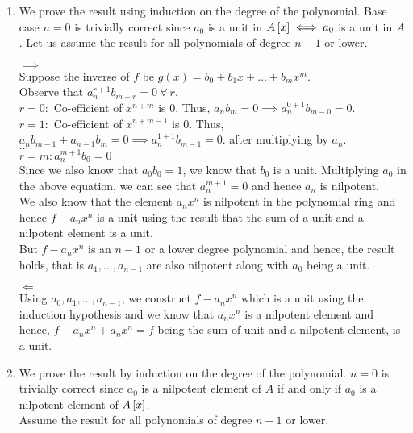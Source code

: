 \begin{enumerate}

	\item
	We prove the result using induction on the degree of the polynomial.
	Base case \( n = 0 \) is trivially correct since \( a_0 \) is a unit
	in \( A\left[ x \right] \iff a_0 \) is a unit in \( A \).
	Let us assume the result for all polynomials of degree \( n-1 \) or lower.

	\( \implies \) \\
	Suppose the inverse of \( f \) be
	\( g(x) = b_0 + b_1 x + \ldots + b_m x^m \). \\
	Observe that \( a_n^{r+1} b_{m-r} = 0 \ \forall\ r \). \\
	\( r = 0 : \) Co-efficient of \( x^{n+m} \) is 0.
	Thus, \( a_n b_m = 0 \implies a_n^{0+1} b_{m-0} = 0 \). \\
	\( r = 1 : \) Co-efficient of \( x^{n+m-1} \) is 0.
	Thus, \( a_n b_{m-1} + a_{n-1} b_m = 0 \implies a_n^{1+1} b_{m-1} = 0 \).
	after multiplying by \( a_n \). \\
	\( \ldots \) \\
	\( r = m : a_n^{m+1} b_0 = 0 \) \\
	Since we also know that \( a_0 b_0 = 1 \), we know that \( b_0 \) is
	a unit.
	Multiplying \( a_0 \) in the above equation, we can see that
	\( a_n^{m+1} = 0 \) and hence \( a_n \) is nilpotent. \\
	We also know that the element \( a_n x^n \) is nilpotent in the
	polynomial ring and hence \( f - a_n x^n \) is a unit using the
	result that the sum of a unit and a nilpotent element is a unit. \\
	But \( f - a_n x^n \) is an \( n-1 \) or a lower degree polynomial and
	hence, the result holds, that is \( a_1, \ldots, a_{n-1} \) are also
	nilpotent along with \( a_0 \) being a unit.

	\( \Longleftarrow \) \\
	Using \( a_0, a_1, \ldots, a_{n-1} \), we construct \( f - a_n x^n \)
	which is a unit using the induction hypothesis and we know that
	\( a_n x^n \) is a nilpotent element and hence,
	\( f - a_n x^n + a_n x^n = f \) being the sum of unit and
	a nilpotent element, is a unit.


	\item
	We prove the result by induction on the degree of the polynomial.
	\( n = 0 \) is trivially correct since
	\( a_0 \) is a nilpotent element of \( A \) if and only if \( a_0 \) is
	a nilpotent element of \( A\left[ x \right] \). \\
	Assume the result for all polynomials of degree \( n-1 \) or lower.


\end{enumerate}
